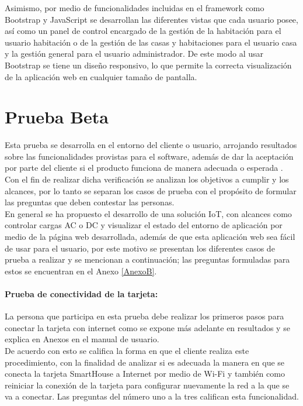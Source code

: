 Asimismo, por medio de funcionalidades incluidas en el framework como Bootstrap y JavaScript se desarrollan las diferentes vistas que cada usuario posee, así como un panel de control encargado de la gestión de la habitación para el usuario habitación o de la gestión de las casas y habitaciones para el usuario casa y la gestión general para el usuario administrador. De este modo al usar Bootstrap se tiene un diseño responsivo, lo que permite la correcta visualización de la aplicación web en cualquier tamaño de pantalla.\\

\section{Prueba Beta}

Esta prueba se desarrolla en el entorno del cliente o usuario, arrojando resultados sobre las funcionalidades provistas para el software, además de dar la aceptación por parte del cliente si el producto funciona de manera adecuada o esperada \cite{PB}. Con el fin de realizar dicha verificación se analizan los objetivos a cumplir y los alcances, por lo tanto se separan los casos de prueba con el propósito de formular las preguntas que deben contestar las personas.\\

En general se ha propuesto el desarrollo de una solución IoT, con alcances como controlar cargas AC o DC y visualizar el estado del entorno de aplicación por medio de la página web desarrollada, además de que esta aplicación web sea fácil de usar para el usuario, por este motivo se presentan los diferentes casos de prueba a realizar y se mencionan a continuación; las preguntas formuladas para estos se encuentran en el Anexo \ref{AnexoB}.

\paragraph{Prueba de conectividad de la tarjeta:} La persona que participa en esta prueba debe realizar los primeros pasos para conectar la tarjeta con internet como se expone más adelante en resultados y se explica en Anexos en el manual de usuario.\\

De acuerdo con esto se califica la forma en que el cliente realiza este procedimiento, con la finalidad de analizar si es adecuada la manera en que se conecta la tarjeta SmartHouse a Internet por medio de Wi-Fi y también como reiniciar la conexión de la tarjeta para configurar nuevamente la red a la que se va a conectar. Las preguntas del número uno a la tres califican esta funcionalidad.\\

